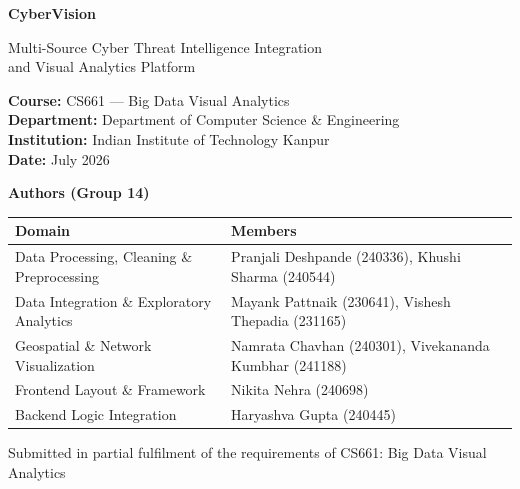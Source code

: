 \documentclass[a4paper, 12pt]{report}
\begin{document}
\begin{titlepage}
    \begin{center}
        \vspace*{0.5cm}
        \Huge
        \textbf{CyberVision}
        
        \vspace{0.5cm}
        \Large
        Multi-Source Cyber Threat Intelligence Integration\\
        and Visual Analytics Platform
        
        \vspace{1.5cm}
        \large
        \textbf{Course:} CS661 --- Big Data Visual Analytics\\
        \textbf{Department:} Department of Computer Science \& Engineering\\
        \textbf{Institution:} Indian Institute of Technology Kanpur\\
        \textbf{Date:} July 2026
        
        \vspace{1.5cm}
        \Large
        \textbf{Authors (Group 14)}
        
        \vspace{0.5cm}
        \small
        \begin{table}[h!]
        \centering
        \begin{tabular}{|l|p{8.5cm}|}
        \hline
        \textbf{Domain} & \textbf{Members} \\
        \hline
        Data Processing, Cleaning \& Preprocessing & Pranjali Deshpande (240336), Khushi Sharma (240544) \\
        \hline
        Data Integration \& Exploratory Analytics & Mayank Pattnaik (230641), Vishesh Thepadia (231165) \\
        \hline
        Geospatial \& Network Visualization & Namrata Chavhan (240301), Vivekananda Kumbhar (241188) \\
        \hline
        Frontend Layout \& Framework & Nikita Nehra (240698) \\
        \hline
        Backend Logic Integration & Haryashva Gupta (240445) \\
        \hline
        \end{tabular}
        \end{table}
        
        \vfill
        \small
        Submitted in partial fulfilment of the requirements of CS661: Big Data Visual Analytics
        \vspace{0.8cm}
    \end{center}
\end{titlepage}
\end{document}
